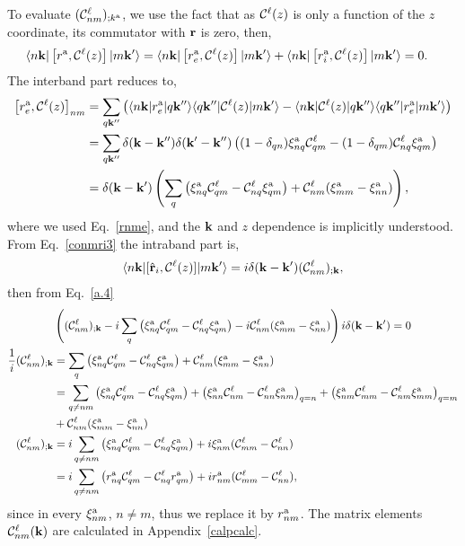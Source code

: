 To evaluate $({\mathbf{\cal C}}^\ell_{nm})_{;k^{\mathrm{a}}}$, we use the fact that as
${\mathbf{\cal C}}^\ell(z)$ is only a function of the $z$ coordinate, its commutator
with $\mathbf{r}$ is zero, then,
\begin{align}\label{a.4}
\langle n\mathbf{k} |
\left[r^{\mathrm{a}},{\mathbf{\cal C}}^\ell(z)\right]
| m\mathbf{k}' \rangle
&=
\langle n\mathbf{k} |
\left[r_e^{\mathrm{a}},{\mathbf{\cal C}}^\ell(z)\right]
| m\mathbf{k}' \rangle
+
\langle n\mathbf{k} |
\left[r_i^{\mathrm{a}},{\mathbf{\cal C}}^\ell(z)\right]
| m\mathbf{k}' \rangle
=
 0
.
\end{align} 
The interband part reduces to,
\begin{align}\label{a.5}
\left[r_e^{\mathrm{a}},{\mathbf{\cal C}}^\ell(z)\right]_{nm}
&=
\sum_{q\mathbf{k}''}
\left(
\langle n\mathbf{k} |
r_e^{\mathrm{a}}
| q\mathbf{k}'' \rangle
\langle q\mathbf{k}'' |
{\mathbf{\cal C}}^\ell(z)
| m\mathbf{k}' \rangle
-
\langle n\mathbf{k} |
{\mathbf{\cal C}}^\ell(z)
 | q\mathbf{k}'' \rangle
\langle q\mathbf{k}'' |
r_e^{\mathrm{a}}
| m\mathbf{k}' \rangle
\right)
\nonumber\\
&=
\sum_{q\mathbf{k}''}
\delta(\mathbf{k}-\mathbf{k}'')
\delta(\mathbf{k}'-\mathbf{k}'')
\left(
(1-\delta_{qn})
\xi_{nq}^{\mathrm{a}}
{\mathbf{\cal C}}^\ell_{qm}
-
(1-\delta_{qm})
{\mathbf{\cal C}}^\ell_{nq}
\xi_{qm}^{\mathrm{a}}
\right)
\nonumber\\
&=
\delta(\mathbf{k}-\mathbf{k}')
\left(
\sum_{q}
\left(
\xi_{nq}^{\mathrm{a}}
{\mathbf{\cal C}}^\ell_{qm}
-
{\mathbf{\cal C}}^\ell_{nq}
\xi_{qm}^{\mathrm{a}}
\right)
+
{\mathbf{\cal C}}^\ell_{nm}(\xi_{mm}^{\mathrm{a}}-\xi_{nn}^{\mathrm{a}})
\right)
,
\end{align}
where we used Eq.~\eqref{rnme}, and the $\mathbf{k}$ and $z$ dependence is implicitly
understood. From Eq.~\eqref{conmri3} the intraband part is,
\begin{align}\label{a.6}
\langle n\mathbf{k} |[\hat{\mathbf{r}}_i,{\mathbf{\cal C}}^\ell(z)]| m\mathbf{k}' \rangle
=i\delta(\mathbf{k}-\mathbf{k}')({\mathbf{\cal C}}^\ell_{nm})_{;\mathbf{k}}
,
\end{align}
then from Eq.~\eqref{a.4}
\begin{align}\label{a.7}
&
\left(
({\mathbf{\cal C}}^\ell_{nm})_{;\mathbf{k}}
-i
\sum_{q}
\left(
\xi_{nq}^{\mathrm{a}}
{\mathbf{\cal C}}^\ell_{qm}
-
{\mathbf{\cal C}}^\ell_{nq}
\xi_{qm}^{\mathrm{a}}
\right)
-i
{\mathbf{\cal C}}^\ell_{nm}(\xi_{mm}^{\mathrm{a}}-\xi_{nn}^{\mathrm{a}})
\right) i\delta(\mathbf{k}-\mathbf{k}')
=0
\nonumber\\
\frac{1}{i}({\mathbf{\cal C}}^\ell_{nm})_{;\mathbf{k}}
&=
\sum_{q}
\left(
\xi_{nq}^{\mathrm{a}}
{\mathbf{\cal C}}^\ell_{qm}
-
{\mathbf{\cal C}}^\ell_{nq}
\xi_{qm}^{\mathrm{a}}
\right)
+
{\mathbf{\cal C}}^\ell_{nm}(\xi_{mm}^{\mathrm{a}}-\xi_{nn}^{\mathrm{a}})
\nonumber\\
&=
\sum_{q\ne nm}
\left(
\xi_{nq}^{\mathrm{a}}
{\mathbf{\cal C}}^\ell_{qm}
-
{\mathbf{\cal C}}^\ell_{nq}
\xi_{qm}^{\mathrm{a}}
\right)
+
\left(
\xi_{nn}^{\mathrm{a}}
{\mathbf{\cal C}}^\ell_{nm}
-
{\mathbf{\cal C}}^\ell_{nn}
\xi_{nm}^{\mathrm{a}}
\right)_{q=n}
+
\left(
\xi_{nm}^{\mathrm{a}}
{\mathbf{\cal C}}^\ell_{mm}
-
{\mathbf{\cal C}}^\ell_{nm}
\xi_{mm}^{\mathrm{a}}
\right)_{q=m}
\nonumber\\
&+
{\mathbf{\cal C}}^\ell_{nm}(\xi_{mm}^{\mathrm{a}}-\xi_{nn}^{\mathrm{a}})
\nonumber\\
({\mathbf{\cal C}}^\ell_{nm})_{;\mathbf{k}}
&=
i\sum_{q\ne nm}
\left(
\xi_{nq}^{\mathrm{a}}
{\mathbf{\cal C}}^\ell_{qm}
-
{\mathbf{\cal C}}^\ell_{nq}
\xi_{qm}^{\mathrm{a}}
\right)
+i\xi_{nm}^{\mathrm{a}}({\mathbf{\cal C}}^\ell_{mm}-{\mathbf{\cal C}}^\ell_{nn})
\nonumber\\
&=
i\sum_{q\ne nm}
\left(
r_{nq}^{\mathrm{a}}
{\mathbf{\cal C}}^\ell_{qm}
-
{\mathbf{\cal C}}^\ell_{nq}
r_{qm}^{\mathrm{a}}
\right)
+ir_{nm}^{\mathrm{a}}({\mathbf{\cal C}}^\ell_{mm}-{\mathbf{\cal C}}^\ell_{nn})
,
\end{align} 
since in every $\xi_{nm}^{\mathrm{a}}$, $n\ne m$, thus we replace it by $r^{\mathrm{a}}_{nm}$. 
The matrix elements ${\mathbf{\cal C}}^\ell_{nm}(\mathbf{k})$ are calculated in Appendix~\ref{calpcalc}. 

